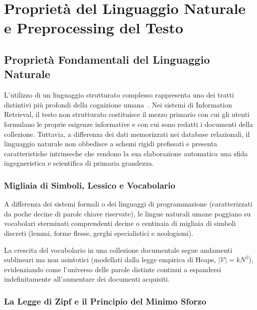 \chapter{Propriet\`a del Linguaggio Naturale e Preprocessing del Testo}
\label{chap:nlp-preprocessing}
\label{chap:nlp-testo}

\FloatBarrier
\section{Propriet\`a Fondamentali del Linguaggio Naturale}
\label{sec:proprieta-linguaggio-naturale}

L'utilizzo di un linguaggio strutturato complesso rappresenta uno dei tratti distintivi pi\`u profondi della cognizione umana~\cite{manning2008,bird2009}. Nei sistemi di Information Retrieval, il testo non strutturato costituisce il mezzo primario con cui gli utenti formulano le proprie esigenze informative e con cui sono redatti i documenti della collezione. Tuttavia, a differenza dei dati memorizzati nei database relazionali, il linguaggio naturale non obbedisce a schemi rigidi prefissati e presenta caratteristiche intrinseche che rendono la sua elaborazione automatica una sfida ingegneristica e scientifica di primaria grandezza.

\FloatBarrier
\subsection{Migliaia di Simboli, Lessico e Vocabolario}
\label{subsec:simboli-lessico}

A differenza dei sistemi formali o dei linguaggi di programmazione (caratterizzati da poche decine di parole chiave riservate), le lingue naturali umane poggiano su vocabolari sterminati comprendenti decine o centinaia di migliaia di simboli discreti (lemmi, forme flesse, gerghi specialistici e neologismi). 

La crescita del vocabolario in una collezione documentale segue andamenti sublineari ma non asintotici (modellati dalla legge empirica di Heaps, $|\mathcal{V}| = k N^\beta$), evidenziando come l'universo delle parole distinte continui a espandersi indefinitamente all'aumentare dei documenti acquisiti.

\FloatBarrier
\subsection{La Legge di Zipf e il Principio del Minimo Sforzo}
\label{subsec:legge-zipf}

